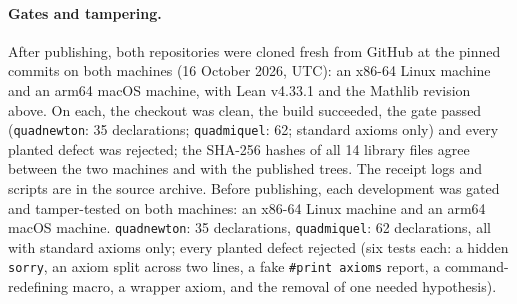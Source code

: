 \documentclass[11pt]{article}
\theoremstyle{definition}
\theoremstyle{remark}
\newcommand{\lean}[1]{\texttt{#1}}
\begin{document}
\paragraph{Gates and tampering.} After publishing, both repositories were cloned fresh from GitHub at
the pinned commits on both machines (16 October 2026, UTC): an x86-64 Linux machine and an arm64 macOS
machine, with Lean v4.33.1 and the Mathlib revision above. On each, the checkout was clean, the build
succeeded, the gate passed (\lean{quadnewton}: 35 declarations; \lean{quadmiquel}: 62; standard axioms
only) and every planted defect was rejected; the SHA-256 hashes of all 14 library files agree between
the two machines and with the published trees. The receipt logs and scripts are in the source archive.
Before publishing, each development
was gated and tamper-tested on both machines: an x86-64 Linux machine and an arm64 macOS machine.
\lean{quadnewton}: 35 declarations, \lean{quadmiquel}: 62 declarations, all with standard axioms only;
every planted defect rejected (six tests each: a hidden \lean{sorry}, an axiom split across two lines,
a fake \lean{\#print axioms} report, a command-redefining macro, a wrapper axiom, and the removal of
one needed hypothesis).
\end{document}
